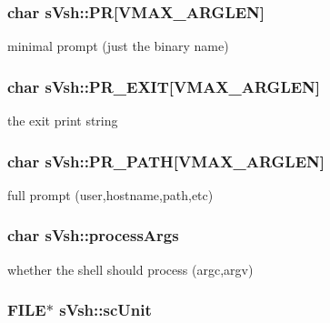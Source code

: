 \subsubsection[{P\+R}]{\setlength{\rightskip}{0pt plus 5cm}char s\+Vsh\+::\+P\+R[{\bf V\+M\+A\+X\+\_\+\+A\+R\+G\+L\+E\+N}]}\label{a00007_ad8d9d3a62f8a4a3cb4378aa58df6c976}


minimal prompt (just the binary name) 

\subsubsection[{P\+R\+\_\+\+E\+X\+I\+T}]{\setlength{\rightskip}{0pt plus 5cm}char s\+Vsh\+::\+P\+R\+\_\+\+E\+X\+I\+T[{\bf V\+M\+A\+X\+\_\+\+A\+R\+G\+L\+E\+N}]}\label{a00007_a5973c822b71c353f131271631bbb43d0}


the exit print string 

\subsubsection[{P\+R\+\_\+\+P\+A\+T\+H}]{\setlength{\rightskip}{0pt plus 5cm}char s\+Vsh\+::\+P\+R\+\_\+\+P\+A\+T\+H[{\bf V\+M\+A\+X\+\_\+\+A\+R\+G\+L\+E\+N}]}\label{a00007_a3d143e1a14f7ccd95292039d17679c17}


full prompt (user,hostname,path,etc) 

\subsubsection[{process\+Args}]{\setlength{\rightskip}{0pt plus 5cm}char s\+Vsh\+::process\+Args}\label{a00007_a4787c933c7915d6c1f8500e8d97abe7c}


whether the shell should process (argc,argv) 

\subsubsection[{sc\+Unit}]{\setlength{\rightskip}{0pt plus 5cm}F\+I\+L\+E$\ast$ s\+Vsh\+::sc\+Unit}\label{a00007_a471927ccabdbbb75601d1d406e8cbc76}


